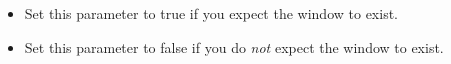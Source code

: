 \begin{itemize}
\item Set this parameter to true if you expect the window to exist.
\item Set this parameter to false if you do \emph{not} expect the window to exist.
\end{itemize}
